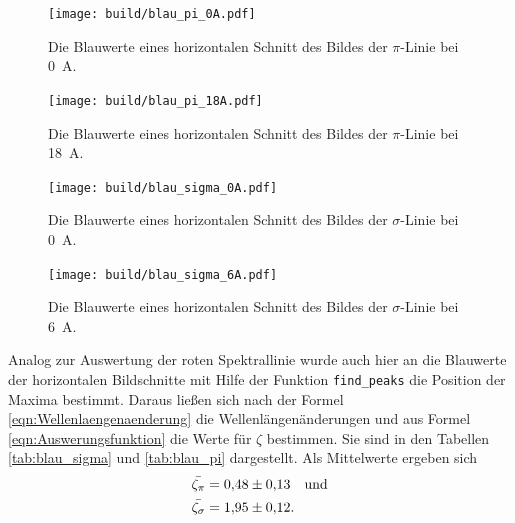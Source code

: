 \begin{figure}
  \centering
  \texttt{[image: build/blau\_pi\_0A.pdf]}
  \caption{Die Blauwerte eines horizontalen Schnitt des Bildes der
    $\pi$-Linie bei \SI{0}{\ampere}.}
  \label{fig:BlauPiSchnitt1}
\end{figure}
\begin{figure}
  \centering
  \texttt{[image: build/blau\_pi\_18A.pdf]}
  \caption{Die Blauwerte eines horizontalen Schnitt des Bildes der
    $\pi$-Linie bei \SI{18}{\ampere}.}
  \label{fig:BlauPiSchnitt2}
\end{figure}
\begin{figure}
  \centering
  \texttt{[image: build/blau\_sigma\_0A.pdf]}
  \caption{Die Blauwerte eines horizontalen Schnitt des Bildes der
    $\sigma$-Linie bei \SI{0}{\ampere}.}
  \label{fig:BlauSigmaSchnitt1}
\end{figure}
\begin{figure}
  \centering
  \texttt{[image: build/blau\_sigma\_6A.pdf]}
  \caption{Die Blauwerte eines horizontalen Schnitt des Bildes der
    $\sigma$-Linie bei \SI{6}{\ampere}.}
  \label{fig:BlauSigmaSchnitt2}
\end{figure}

Analog zur Auswertung der roten Spektrallinie wurde auch hier an die
Blauwerte der horizontalen Bildschnitte mit Hilfe der Funktion
\texttt{find\_peaks} die Position der Maxima bestimmt.
Daraus ließen sich nach der Formel \eqref{eqn:Wellenlaengenaenderung}
die Wellenlängenänderungen und aus Formel \eqref{eqn:Auswerungsfunktion}
die Werte für $\zeta$ bestimmen.
Sie sind in den Tabellen \ref{tab:blau_sigma} und \ref{tab:blau_pi} dargestellt.
Als Mittelwerte ergeben sich
\begin{align*}
  \mean{\zeta_{\pi}} &= \num{0.48(13)} \quad \text{und}\\
  \mean{\zeta_{\sigma}} &= \num{1.95(12)}. \\
\end{align*}


